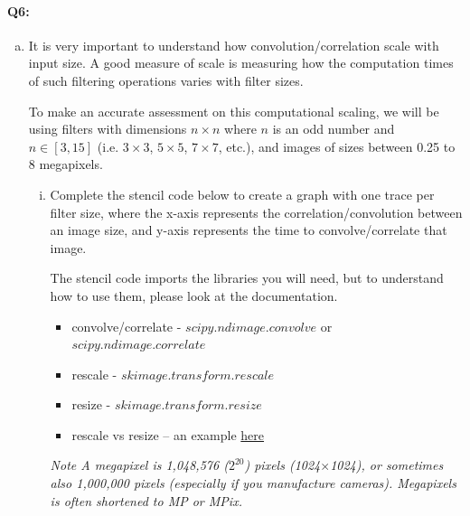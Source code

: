\paragraph{Q6:}
\begin{enumerate}[(a)]
    \item
    It is very important to understand how convolution/correlation scale with input size. A good measure of scale is measuring how the computation times of such filtering operations varies with filter sizes.
    
    To make an accurate assessment on this computational scaling, we will be using filters with dimensions $n \times n$ where $n$ is an odd number and $n \in [3, 15]$ (i.e. $3\times3$, $5\times5$, $7\times7$, etc.), and images of sizes between 0.25 to 8 megapixels.
    
    \begin{enumerate}[(i)]
    \item
    
    Complete the stencil code below to create a graph with one trace per filter size, where the x-axis represents the correlation/convolution between an image size, and y-axis represents the time to convolve/correlate that image.

    The stencil code imports the libraries you will need, but to understand how to use them, please look at the documentation.
    \begin{itemize}
    \item convolve/correlate - \href{https://docs.scipy.org/doc/scipy/reference/generated/scipy.ndimage.convolve.html}{$scipy.ndimage.convolve$} or \href{https://docs.scipy.org/doc/scipy/reference/generated/scipy.ndimage.correlate.html}{$scipy.ndimage.correlate$}
    \item rescale - \href{https://scikit-image.org/docs/dev/api/skimage.transform.html#skimage.transform.rescale}{$skimage.transform.rescale$}
    \item resize - \href{https://scikit-image.org/docs/dev/api/skimage.transform.html#skimage.transform.resize}{$skimage.transform.resize$}
    \item rescale vs resize – an example \href{http://scikit-image.org/docs/dev/auto_examples/transform/plot_rescale.html}{here}
    \end{itemize}

\emph{Note A megapixel is 1,048,576 ($2^{20}$) pixels (1024$\times$1024), or sometimes also 1,000,000 pixels (especially if you manufacture cameras). Megapixels is often shortened to MP or MPix.}


\end{enumerate}
\end{enumerate}
